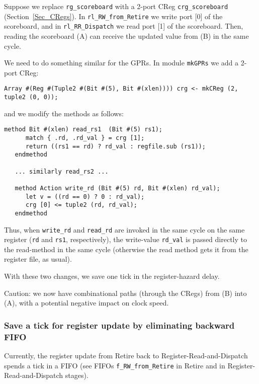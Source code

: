 Suppose we replace \verb|rg_scoreboard| with a 2-port CReg
\verb|crg_scoreboard| (Section~\ref{Sec_CRegs}). In
\verb|rl_RW_from_Retire| we write port [0] of the scoreboard, and in
\verb|rl_RR_Dispatch| we read port [1] of the scoreboard.  Then,
reading the scoreboard (A) can receive the updated value from (B) in
the same cycle.

We need to do something similar for the GPRs.  In module \verb|mkGPRs|
we add a 2-port CReg:

{\footnotesize
\begin{Verbatim}[frame=single, label=src\_Common/GPRs.bsv]
 Array #(Reg #(Tuple2 #(Bit #(5), Bit #(xlen)))) crg <- mkCReg (2, tuple2 (0, 0));
\end{Verbatim}
}

and we modify the methods as follows:

{\footnotesize
\begin{Verbatim}[frame=single, label=src\_Common/GPRs.bsv]
   method Bit #(xlen) read_rs1  (Bit #(5) rs1);
      match { .rd, .rd_val } = crg [1];
      return ((rs1 == rd) ? rd_val : regfile.sub (rs1));
   endmethod

   ... similarly read_rs2 ...

   method Action write_rd (Bit #(5) rd, Bit #(xlen) rd_val);
      let v = ((rd == 0) ? 0 : rd_val);
      crg [0] <= tuple2 (rd, rd_val);
   endmethod
\end{Verbatim}
}

Thus, when \verb|write_rd| and \verb|read_rd| are invoked in the same
cycle on the same register (\verb|rd| and \verb|rs1|, respectively),
the write-value \verb|rd_val| is passed directly to the read-method in
the same cycle (otherwise the read method gets it from the register
file, as usual).

With these two changes, we save one tick in the register-hazard delay.

Caution: we now have combinational paths (through the CRegs) from
(B) into (A), with a potential negative impact on clock speed.


\subsubsection{Save a tick for register update by eliminating backward FIFO}

Currently, the register update from Retire back to
Register-Read-and-Dispatch spends a tick in a FIFO (see FIFOs
\verb|f_RW_from_Retire| in Retire and in Register-Read-and-Dispatch
stages).

